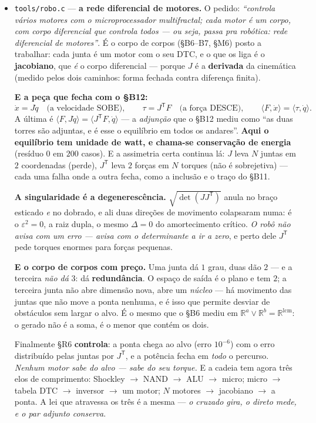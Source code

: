 \documentclass[11pt]{article}
\newcommand{\code}[1]{\texttt{\small #1}}
\newcommand{\R}{\mathbb R}
\theoremstyle{plain}
\theoremstyle{remark}
\begin{document}
\begin{itemize}
\item \code{tools/robo.c} --- \textbf{a rede diferencial de motores.} O pedido: \emph{``controla
vários motores com o microprocessador multifractal; cada motor é um corpo, com corpo diferencial
que controla todos --- ou seja, passa pra robótica: rede diferencial de motores''}. É o corpo de
corpos (§B6--B7, §M6) posto a trabalhar: cada junta é um motor com o seu DTC, e o que os liga é o
\textbf{jacobiano}, que \emph{é} o corpo diferencial --- porque $J$ é a \textbf{derivada} da
cinemática (medido pelos dois caminhos: forma fechada contra diferença finita).

\textbf{E a peça que fecha com o §B12:}
\[
 \dot x = J\dot q \quad\text{(a velocidade SOBE)},\qquad
 \tau = J^{\mathsf T}F \quad\text{(a força DESCE)},\qquad
 \langle F,\dot x\rangle = \langle \tau,\dot q\rangle.
\]
A última é $\langle F,J\dot q\rangle=\langle J^{\mathsf T}F,\dot q\rangle$ --- a \emph{adjunção} que
o §B12 mediu como ``as duas torres são adjuntas, e é esse o equilíbrio em todos os andares''.
\textbf{Aqui o equilíbrio tem unidade de watt, e chama-se conservação de energia} (resíduo $0$ em
$200$ casos). E a assimetria certa continua lá: $J$ leva $N$ juntas em $2$ coordenadas (perde),
$J^{\mathsf T}$ leva $2$ forças em $N$ torques (não é sobrejetiva) --- cada uma falha onde a outra
fecha, como a inclusão e o traço do §B11.

\textbf{A singularidade é a degenerescência.} $\sqrt{\det(JJ^{\mathsf T})}$ anula no braço esticado
\emph{e} no dobrado, e ali duas direções de movimento colapsaram numa: é o $\varepsilon^2=0$, a raiz
dupla, o mesmo $\Delta=0$ do amortecimento crítico. \emph{O robô não avisa com um erro --- avisa com
o determinante a ir a zero}, e perto dele $J^{\mathsf T}$ pede torques enormes para forças pequenas.

\textbf{E o corpo de corpos com preço.} Uma junta dá $1$ grau, duas dão $2$ --- e a terceira
\emph{não dá} $3$: dá \textbf{redundância}. O espaço de saída é o plano e tem $2$; a terceira junta
não abre dimensão nova, abre um \emph{núcleo} --- há movimento das juntas que não move a ponta
nenhuma, e é isso que permite desviar de obstáculos sem largar o alvo. É o mesmo que o §B6 mediu em
$\R^a\vee\R^b=\R^{\mathrm{lcm}}$: o gerado não é a soma, é o menor que contém os dois.

Finalmente §R6 \textbf{controla}: a ponta chega ao alvo (erro $10^{-6}$) com o erro distribuído
pelas juntas por $J^{\mathsf T}$, e a potência fecha em \emph{todo} o percurso. \emph{Nenhum motor
sabe do alvo --- sabe do seu torque.} E a cadeia tem agora três elos de comprimento: Shockley $\to$
NAND $\to$ ALU $\to$ micro; micro $\to$ tabela DTC $\to$ inversor $\to$ um motor; $N$ motores $\to$
jacobiano $\to$ a ponta. A lei que atravessa os três é a mesma --- \emph{o cruzado gira, o direto
mede, e o par adjunto conserva}.


\end{itemize}
\end{document}
